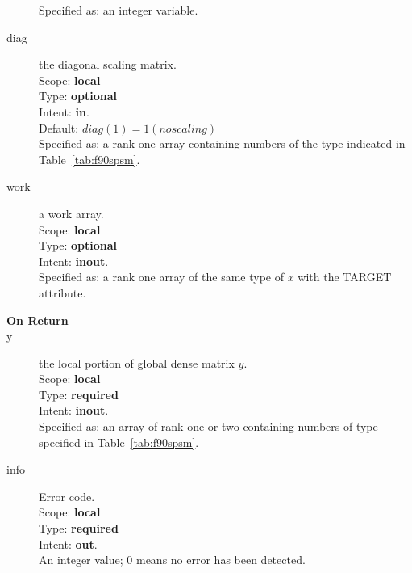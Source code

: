 \begin{description}
Specified as: an integer variable.
\item[diag] the diagonal scaling matrix.\\
Scope: {\bf local} \\
Type: {\bf optional}\\	
Intent: {\bf in}.\\
Default: $diag(1) = 1 (no scaling)$\\	
Specified as: a rank one  array containing numbers of the type
indicated in Table~\ref{tab:f90spsm}.
\item[work] a work array. \\
Scope: {\bf local} \\
Type: {\bf optional}\\	
Intent: {\bf inout}.\\
Specified as: a rank one array of the same type of $x$ with the
TARGET attribute. 

\item[\bf On Return] 
\item[y] the local portion of global dense matrix
$y$. %
\\
Scope: {\bf local} \\
Type: {\bf required} \\
Intent: {\bf inout}.\\
Specified as: an array of rank one or two
containing numbers of type specified in
Table~\ref{tab:f90spsm}.
\item[info] Error code.\\
Scope: {\bf local} \\
Type: {\bf required} \\
Intent: {\bf out}.\\
An integer value; 0 means no error has been detected. 
\end{description}




